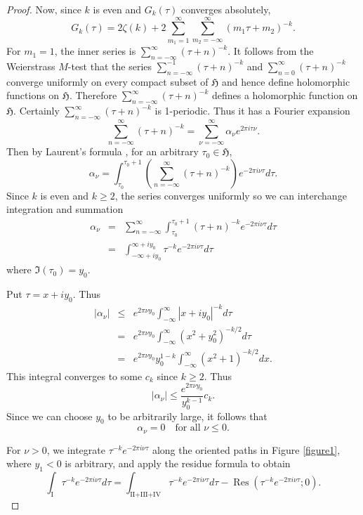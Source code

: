 \documentclass{article}
\DeclareMathOperator{\Res}{Res}
\begin{document}
\begin{proof}
Now, since $k$ is even and $G_k(\tau)$ converges absolutely,
\[
G_k(\tau)=2\zeta(k)+2\sum_{m_1=1}^\infty \sum_{m_2=-\infty}^\infty (m_1\tau+m_2)^{-k}.
\]
For $m_1=1$, the inner series is $\sum_{n=-\infty}^\infty (\tau+n)^{-k}$. It
follows from the Weierstrass $M$-test that the series $\sum_{n=-\infty}^{-1} (\tau+n)^{-k}$
and $\sum_{n=0}^\infty (\tau+n)^{-k}$ converge uniformly on every compact subset of $\mathfrak{H}$ and hence define
holomorphic functions on $\mathfrak{H}$. Therefore $\sum_{n=-\infty}^\infty (\tau+n)^{-k}$ defines a holomorphic
function on $\mathfrak{H}$. Certainly $\sum_{n=-\infty}^\infty (\tau+n)^{-k}$ is 1-periodic. Thus it has a Fourier
expansion
\[
\sum_{n=-\infty}^\infty (\tau+n)^{-k}=\sum_{\nu=-\infty}^\infty \alpha_\nu e^{2\pi i\tau \nu}.
\]
Then by Laurent's formula \cite[Chapter V, Theorem 2.1]{MR1659317}, for an arbitrary $\tau_0 \in \mathfrak{H}$,
\[
\alpha_\nu=\int_{\tau_0}^{\tau_0+1} (\sum_{n=-\infty}^\infty (\tau+n)^{-k})e^{-2\pi i\nu \tau} d\tau.
\]
Since $k$ is even and $k \geq 2$, the series converges uniformly so we can interchange integration and summation
\begin{eqnarray}
\alpha_\nu&=&\sum_{n=-\infty}^\infty \int_{\tau_0}^{\tau_0+1} (\tau+n)^{-k} e^{-2\pi i\nu \tau}d\tau\nonumber \\
&=&\int_{-\infty+iy_0}^{\infty+iy_0} \tau^{-k}e^{-2\pi i\nu \tau}d\tau \label{eqn:eisII}
\end{eqnarray}
where $\Im(\tau_0)=y_0$.

Put $\tau=x+iy_0$.
Thus
\begin{eqnarray*}
|\alpha_\nu|&\leq&e^{2\pi \nu y_0} \int_{-\infty}^\infty |x+iy_0|^{-k}d\tau\\
&=&e^{2\pi \nu y_0} \int_{-\infty}^\infty (x^2+y_0^2)^{-k/2}d\tau\\
&=&e^{2\pi \nu y_0}y_0^{1-k} \int_{-\infty}^\infty (x^2+1)^{-k/2}dx.
\end{eqnarray*} 
This integral converges to some $c_k$ since $k \geq 2$.
Thus
\[
|\alpha_\nu| \leq \frac{e^{2\pi \nu y_0}}{y_0^{k-1}}c_k.
\]
Since we can choose $y_0$ to be arbitrarily large,  it follows that
\[
\alpha_\nu=0 \quad \textrm{for all $\nu \leq 0$}.
\]

For $\nu>0$,
we integrate $\tau^{-k}e^{-2\pi i\nu \tau}$ along the oriented paths in Figure \ref{figure1}, where
$y_1<0$ is arbitrary,
and apply the residue formula \cite[Theorem 1.2, Chapter VI]{MR1659317} to obtain
\begin{equation}
\label{eqn:eisI}
\int_{\textrm{I}} \tau^{-k}e^{-2\pi i\nu \tau}d\tau=\int_{\textrm{II+III+IV}} \tau^{-k}e^{-2\pi i\nu \tau}d\tau-\Res(\tau^{-k}e^{-2\pi i\nu \tau};0).
\end{equation}


\end{proof}
\end{document}
